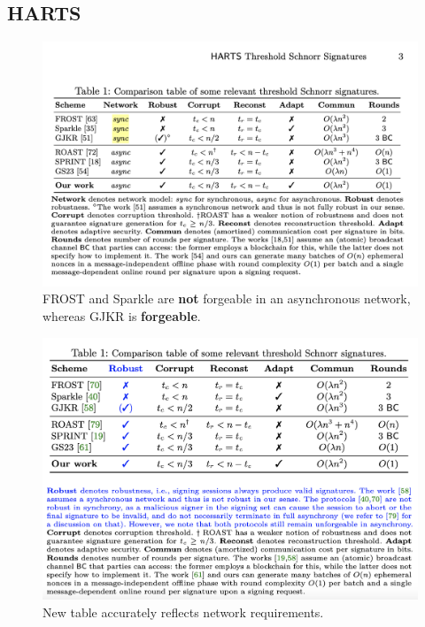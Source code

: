\subsection{HARTS}



\begin{figure}
    \centering
    \includegraphics[width=1\linewidth]{images/HARTS_table.png}
    \caption{FROST and Sparkle are \textbf{not} forgeable in an asynchronous network, whereas GJKR is \textbf{forgeable}.}
\end{figure}

\begin{figure}
    \centering
    \includegraphics[scale=0.45]{images/HARTS_table_new.png}
    \caption{New table accurately reflects network requirements.}
\end{figure}

